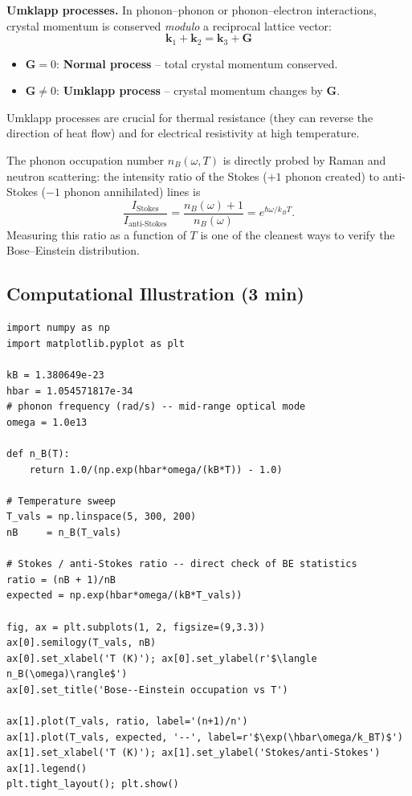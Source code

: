 \documentclass[11pt,a4paper]{article}
\begin{document}
\textbf{Umklapp processes.} In phonon--phonon or phonon--electron interactions,
crystal momentum is conserved \emph{modulo} a reciprocal lattice vector:
\[
\mathbf k_1+\mathbf k_2 = \mathbf k_3+\mathbf G
\]
\begin{itemize}
\item $\mathbf G=0$: \textbf{Normal process} -- total crystal momentum conserved.
\item $\mathbf G\ne0$: \textbf{Umklapp process} -- crystal momentum changes by $\mathbf G$.
\end{itemize}

\begin{keybox}
Umklapp processes are crucial for thermal resistance (they can reverse the direction
of heat flow) and for electrical resistivity at high temperature.
\end{keybox}

\begin{expbox}
The phonon occupation number $n_B(\omega,T)$ is directly probed by Raman and
neutron scattering: the intensity ratio of the Stokes ($+1$ phonon created) to
anti-Stokes ($-1$ phonon annihilated) lines is
\[
\frac{I_{\text{Stokes}}}{I_{\text{anti-Stokes}}} = \frac{n_B(\omega)+1}{n_B(\omega)} = e^{\hbar\omega/k_BT}.
\]
Measuring this ratio as a function of $T$ is one of the cleanest ways to verify the
Bose--Einstein distribution.
\end{expbox}

\subsection{Computational Illustration \hfill \small(3 min)}

\begin{pybox}
\begin{lstlisting}
import numpy as np
import matplotlib.pyplot as plt

kB = 1.380649e-23
hbar = 1.054571817e-34
# phonon frequency (rad/s) -- mid-range optical mode
omega = 1.0e13

def n_B(T):
    return 1.0/(np.exp(hbar*omega/(kB*T)) - 1.0)

# Temperature sweep
T_vals = np.linspace(5, 300, 200)
nB     = n_B(T_vals)

# Stokes / anti-Stokes ratio -- direct check of BE statistics
ratio = (nB + 1)/nB
expected = np.exp(hbar*omega/(kB*T_vals))

fig, ax = plt.subplots(1, 2, figsize=(9,3.3))
ax[0].semilogy(T_vals, nB)
ax[0].set_xlabel('T (K)'); ax[0].set_ylabel(r'$\langle n_B(\omega)\rangle$')
ax[0].set_title('Bose--Einstein occupation vs T')

ax[1].plot(T_vals, ratio, label='(n+1)/n')
ax[1].plot(T_vals, expected, '--', label=r'$\exp(\hbar\omega/k_BT)$')
ax[1].set_xlabel('T (K)'); ax[1].set_ylabel('Stokes/anti-Stokes')
ax[1].legend()
plt.tight_layout(); plt.show()
\end{lstlisting}
\end{pybox}
\end{document}
